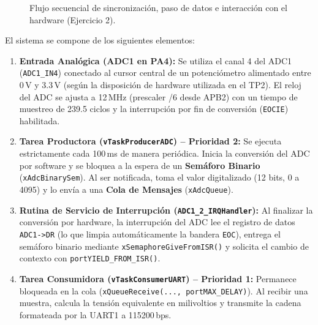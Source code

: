 \documentclass{plantilla}
\begin{document}
\begin{figure}[H]
\caption{Flujo secuencial de sincronización, paso de datos e interacción con el hardware (Ejercicio 2).}
\label{fig_prod_cons}
\end{figure}

El sistema se compone de los siguientes elementos:
\begin{enumerate}
    \item \textbf{Entrada Analógica (ADC1 en PA4):} Se utiliza el canal 4 del ADC1 (\texttt{ADC1\_IN4}) conectado al cursor central de un potenciómetro alimentado entre 0\,V y 3.3\,V (según la disposición de hardware utilizada en el TP2). El reloj del ADC se ajusta a 12\,MHz (prescaler /6 desde APB2) con un tiempo de muestreo de 239.5 ciclos y la interrupción por fin de conversión (\texttt{EOCIE}) habilitada.
    \item \textbf{Tarea Productora (\texttt{vTaskProducerADC}) -- Prioridad 2:} Se ejecuta estrictamente cada 100\,ms de manera periódica. Inicia la conversión del ADC por software y se bloquea a la espera de un \textbf{Semáforo Binario} (\texttt{xAdcBinarySem}). Al ser notificada, toma el valor digitalizado (12 bits, 0 a 4095) y lo envía a una \textbf{Cola de Mensajes} (\texttt{xAdcQueue}).
    \item \textbf{Rutina de Servicio de Interrupción (\texttt{ADC1\_2\_IRQHandler}):} Al finalizar la conversión por hardware, la interrupción del ADC lee el registro de datos \texttt{ADC1->DR} (lo que limpia automáticamente la bandera \texttt{EOC}), entrega el semáforo binario mediante \texttt{xSemaphoreGiveFromISR()} y solicita el cambio de contexto con \texttt{portYIELD\_FROM\_ISR()}.
    \item \textbf{Tarea Consumidora (\texttt{vTaskConsumerUART}) -- Prioridad 1:} Permanece bloqueada en la cola (\texttt{xQueueReceive(..., portMAX\_DELAY)}). Al recibir una muestra, calcula la tensión equivalente en milivoltios y transmite la cadena formateada por la UART1 a 115200\,bps.
\end{enumerate}
\end{document}
